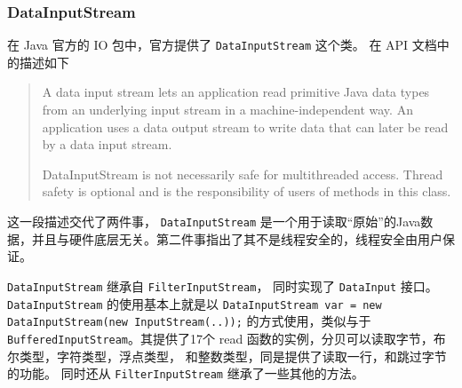 
\subsubsection{DataInputStream}
\label{sec:uml:input:datainputstream}

在 Java 官方的 IO 包中，官方提供了 \lstinline|DataInputStream| 这个类。
在 API 文档中的描述如下
\begin{quote}
  A data input stream lets an application read primitive Java data types from an underlying input stream in a machine-independent way. 
  An application uses a data output stream to write data that can later be read by a data input stream.

  DataInputStream is not necessarily safe for multithreaded access. Thread safety is optional and is the responsibility of users of methods in this class.
\end{quote}

这一段描述交代了两件事， \lstinline|DataInputStream| 是一个用于读取“原始”的Java数据，并且与硬件底层无关。第二件事指出了其不是线程安全的，线程安全由用户保证。

\lstinline|DataInputStream| 继承自 \lstinline|FilterInputStream|， 同时实现了 \lstinline|DataInput| 接口。
\lstinline|DataInputStream| 的使用基本上就是以 \lstinline|DataInputStream var = new DataInputStream(new InputStream(..));| 的方式使用，类似与于
\lstinline|BufferedInputStream|。其提供了17个 read 函数的实例，分贝可以读取字节，布尔类型，字符类型，浮点类型， 和整数类型，同是提供了读取一行，和跳过字节的功能。
同时还从 \lstinline|FilterInputStream| 继承了一些其他的方法。

